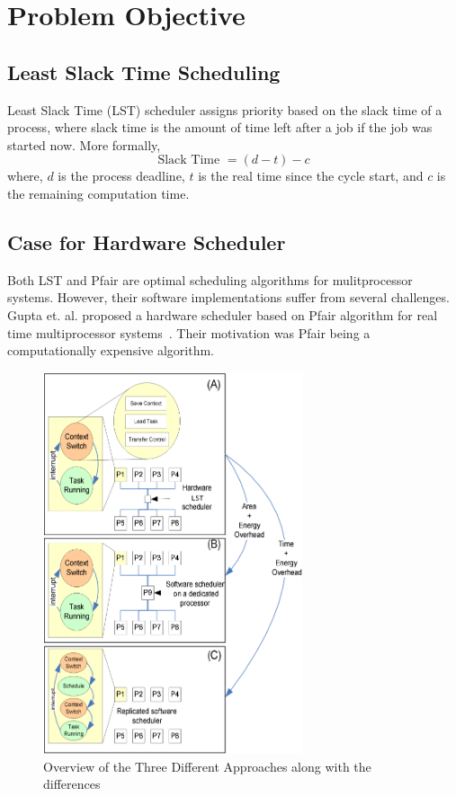 \section{Problem Objective}
\label{sec:Objective}

\subsection{Least Slack Time Scheduling}
Least Slack Time (LST) scheduler assigns priority
based on the slack time of a process, where slack time is the amount of time left
after a job if the job was started now. More formally,
\[\mbox{Slack Time } = (d - t) -c \]
where, $d$ is the process deadline, $t$ is the real time since the cycle start,
and $c$ is the remaining computation time. 

\subsection{Case for Hardware Scheduler}
Both LST and Pfair are optimal scheduling algorithms for mulitprocessor systems.
However, their software implementations suffer from several challenges. Gupta
et. al. proposed a hardware scheduler based on Pfair algorithm for real time
multiprocessor systems~\cite{GUPTA10}. Their motivation was Pfair being a computationally expensive
algorithm. 

\begin{figure}[!h]
\centering
\includegraphics[width=3in]{fig/options.png}
\caption{Overview of the Three Different Approaches along with the
differences}
\label{fig:options}
\end{figure}

